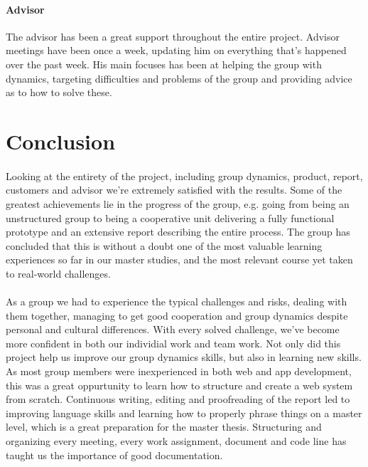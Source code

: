 \paragraph{Advisor} The advisor has been a great support throughout the entire project. Advisor meetings have been once a week, updating him on everything that’s happened over the past week. His main focuses has been at helping the group with dynamics, targeting difficulties and problems of the group and providing advice as to how to solve these. 

\newpage
\section{Conclusion} 

\paragraph{} Looking at the entirety of the project, including group dynamics, product, report, customers and advisor we’re extremely satisfied with the results. Some of the greatest achievements lie in the progress of the group, e.g. going from being an unstructured group to being a cooperative unit delivering a fully functional prototype and an extensive report describing the entire process. The group has concluded that this is without a doubt one of the most valuable learning experiences so far in our master studies, and the most relevant course yet taken to real-world challenges. 

\paragraph{} As a group we had to experience the typical challenges and risks, dealing with them together, managing to get good cooperation and group dynamics despite personal and cultural differences. With every solved challenge, we’ve become more confident in both our individial work and team work. Not only did this project help us improve our group dynamics skills, but also in learning new skills. As most group members were inexperienced in both web and app development, this was a great oppurtunity to learn how to structure and create a web system from scratch. Continuous writing, editing and proofreading of the report led to improving language skills and learning how to properly phrase things on a master level, which is a great preparation for the master thesis. Structuring and organizing every meeting, every work assignment, document and code line has taught us the importance of good documentation. 
